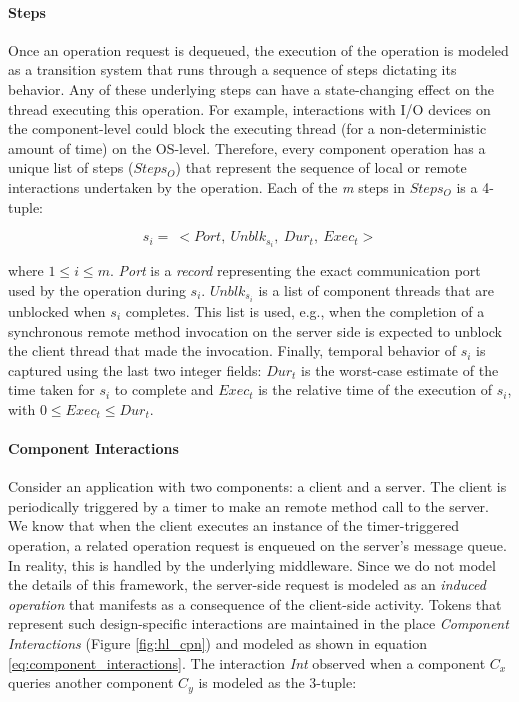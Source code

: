 \paragraph{Steps} 
\label{para:steps}

Once an operation request is dequeued, the execution of the operation is modeled as a transition system that runs through a sequence of steps dictating its behavior. Any of these underlying steps can have a state-changing effect on the thread executing this operation. For example, interactions with I/O devices on the component-level could block the executing thread (for a non-deterministic amount of time) on the OS-level. Therefore, every component operation has a unique list of steps ($Steps_O$) that represent the sequence of local or remote interactions undertaken by the operation. Each of the \emph{m} steps in $Steps_O$ is a 4-tuple:

\vspace{-0.15in}
\begin{equation}
s_i = \ <Port, \ Unblk_{s_i}, \ Dur_t, \ Exec_t>
\end{equation}

where $1 \le i \le m$. \emph{Port} is a \emph{record} representing the exact communication port used by the operation during $s_i$. $Unblk_{s_i}$ is a list of component threads that are unblocked when $s_i$ completes. This list is used, e.g., when the completion of a synchronous remote method invocation on the server side is expected to unblock the client thread that made the invocation. Finally, temporal behavior of $s_i$ is captured using the last two integer fields: \emph{$Dur_t$} is the worst-case estimate of the time taken for $s_i$ to complete and $Exec_t$ is the relative time of the execution of $s_i$, with $0 \le Exec_t \le Dur_t$.

\paragraph{Component Interactions}

Consider an application with two components: a client and a server. The client is periodically triggered by a timer to make an remote method call to the server. We know that when the client executes an instance of the timer-triggered operation, a related operation request is enqueued on the server's message queue. In reality, this is handled by the underlying middleware. Since we do not model the details of this framework, the server-side request is modeled as an \emph{induced operation} that manifests as a consequence of the client-side activity. Tokens that represent such design-specific interactions are maintained in the place \emph{Component Interactions} (Figure \ref{fig:hl_cpn}) and modeled as shown in equation \ref{eq:component_interactions}. The interaction \emph{Int} observed when a component $C_x$ queries another component $C_y$ is modeled as the 3-tuple:

